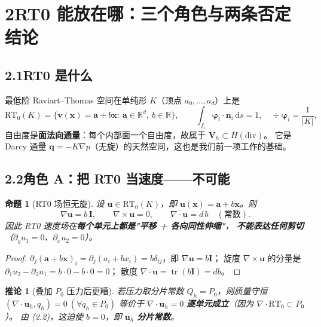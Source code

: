 \documentclass[UTF8,11pt,a4paper]{ctexart}
\theoremstyle{wjplain}
\newtheorem*{proposition}{命题}
\newtheorem*{corollary}{推论}
\theoremstyle{wjdef}
\newcommand{\dd}{\,\mathrm{d}}
\newcommand{\R}{\mathbb{R}}
\newcommand{\bn}{\boldsymbol n}
\newcommand{\bu}{\boldsymbol u}
\newcommand{\bv}{\boldsymbol v}
\newcommand{\bq}{\boldsymbol q}
\newcommand{\bx}{\boldsymbol x}
\newcommand{\bI}{\boldsymbol I}
\newcommand{\bV}{\boldsymbol V}
\newcommand{\bvarphi}{\boldsymbol\varphi}
\newcommand{\grad}{\nabla}
\newcommand{\dive}{\nabla\cdot}
\newcommand{\curl}{\nabla\times}
\newcommand{\RT}{\mathrm{RT}}
\begin{document}
\section{\texorpdfstring{2\quad RT0 能放在哪：三个角色与两条否定结论}{2 RT0 能放在哪：三个角色与两条否定结论}}

\subsection*{2.1\quad RT0 是什么}

最低阶 Raviart--Thomas 空间在单纯形 $K$（顶点 $a_0,\dots,a_d$）上是
\begin{equation}\tag{2.1}
  \RT_0(K)=\bigl\{\bv(\bx)=\boldsymbol a+b\bx:\ \boldsymbol a\in\R^d,\ b\in\R\bigr\},
  \qquad
  \int_{f_i}\bvarphi_i\cdot\bn_i\dd s=1,\quad
  \div\bvarphi_i=\frac1{\lvert K\rvert},
\end{equation}
自由度是\textbf{面法向通量}：每个内部面一个自由度，故属于 $\bV_h\subset H(\mathrm{div})$。
它是 Darcy 通量 $\bq=-K\grad p$（无旋）的天然空间，这也是我们前一项工作的基础。

\subsection*{2.2\quad 角色 A：把 RT0 当速度——不可能}

\begin{proposition}[RT0 场恒无旋]
设 $\bu\in\RT_0(K)$，即 $\bu(\bx)=\boldsymbol a+b\bx$。则
\begin{equation}\tag{2.2}
  \grad\bu=b\,\bI,\qquad \curl\bu=0,\qquad \dive\bu=d\,b\quad(\text{常数}).
\end{equation}
因此 RT0 速度场在\textbf{每个单元上都是"平移 + 各向同性伸缩"}，
\textbf{不能表达任何剪切}（$\partial_y u_1=0$、$\partial_x u_2=0$）。
\end{proposition}

\begin{proof}
$\partial_j(\boldsymbol a+b\bx)_i=\partial_j(a_i+bx_i)=b\delta_{ij}$，即 $\grad\bu=b\bI$；
旋度 $\curl\bu$ 的分量是 $\partial_1u_2-\partial_2u_1=b\cdot0-b\cdot0=0$；
散度 $\dive\bu=\operatorname{tr}(b\bI)=db$。
\end{proof}

\begin{corollary}[叠加 $P_0$ 压力后更糟]
若压力取分片常数 $Q_h=P_0$，则质量守恒 $(\dive\bu_h,q_h)=0\ (\forall q_h\in P_0)$
等价于 $\dive\bu_h=0$ \textbf{逐单元成立}（因为 $\dive\RT_0\subset P_0$）。
由 (2.2)，这迫使 $b=0$，即 $\bu_h$ \textbf{分片常数}。
\end{corollary}
\end{document}
